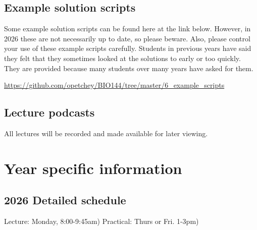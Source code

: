 \documentclass[
  letterpaper,
  8pt,
  a4paper]{book}
\begin{document}
\section*{Example solution scripts}\label{example-solution-scripts}


Some example solution scripts can be found here at the link below.
However, in 2026 these are not necessarily up to date, so please beware.
Also, please control your use of these example scripts carefully.
Students in previous years have said they felt that they sometimes
looked at the solutions to early or too quickly. They are provided
because many students over many years have asked for them.

\url{https://github.com/opetchey/BIO144/tree/master/6_example_scripts}

\section*{Lecture podcasts}\label{lecture-podcasts}


All lectures will be recorded and made available for later viewing.


\chapter*{Year specific information}\label{year-specific-information}


\section*{2026 Detailed schedule}\label{detailed-schedule}


Lecture: Monday, 8:00-9:45am) Practical: Thurs or Fri. 1-3pm)
\end{document}
